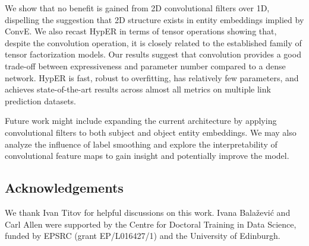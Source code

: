 \documentclass[runningheads]{llncs}
\begin{document}
We  show that no benefit is gained from 2D convolutional filters over 1D, dispelling the suggestion that 2D structure exists in entity embeddings implied by ConvE. We also recast HypER in terms of tensor operations showing that, despite the convolution operation, it is closely related to the established family of tensor factorization models. Our results suggest that convolution provides a good trade-off between expressiveness and parameter number compared to a dense network. HypER is fast, robust to overfitting, has relatively few parameters, and achieves state-of-the-art results across almost all metrics on multiple link prediction datasets.

Future work might include expanding the current architecture by applying convolutional filters to both subject and object entity embeddings. We may also analyze the influence of label smoothing and explore the interpretability of convolutional feature maps to gain insight and potentially improve the model.

\subsection*{Acknowledgements}
We thank Ivan Titov for helpful discussions on this work. Ivana Bala\v{z}evi\'c and Carl Allen were supported by the Centre for Doctoral Training in Data Science, funded by EPSRC (grant EP/L016427/1) and the University of Edinburgh.



\end{document}
